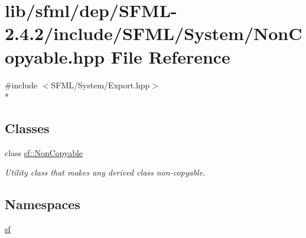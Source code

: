 \hypertarget{sfml_2dep_2_s_f_m_l-2_84_82_2include_2_s_f_m_l_2_system_2_non_copyable_8hpp}{\section{lib/sfml/dep/\-S\-F\-M\-L-\/2.4.2/include/\-S\-F\-M\-L/\-System/\-Non\-Copyable.hpp File Reference}
\label{sfml_2dep_2_s_f_m_l-2_84_82_2include_2_s_f_m_l_2_system_2_non_copyable_8hpp}
}
{\ttfamily \#include $<$S\-F\-M\-L/\-System/\-Export.\-hpp$>$}\\*
\subsection*{Classes}
\begin{DoxyCompactItemize}
\item 
class \hyperlink{classsf_1_1_non_copyable}{sf\-::\-Non\-Copyable}
\begin{DoxyCompactList}\small\item\em Utility class that makes any derived class non-\/copyable. \end{DoxyCompactList}\end{DoxyCompactItemize}
\subsection*{Namespaces}
\begin{DoxyCompactItemize}
\item 
\hyperlink{namespacesf}{sf}
\end{DoxyCompactItemize}
